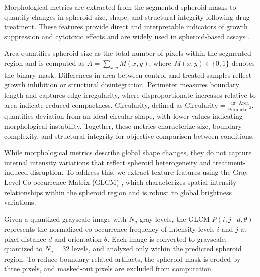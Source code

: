\documentclass[sigconf, nonacm]{acmart}
\begin{document}

Morphological metrics are extracted from the segmented spheroid masks to quantify changes in spheroid size, shape, and structural integrity following drug treatment. These features provide direct and interpretable indicators of growth suppression and cytotoxic effects and are widely used in spheroid-based assays \cite{ref10,ref11}.

Area quantifies spheroid size as the total number of pixels within the segmented region and is computed as $A = \sum_{x,y} M(x,y)$, where $M(x,y) \in \{0,1\}$ denotes the binary mask. Differences in area between control and treated samples reflect growth inhibition or structural disintegration. Perimeter measures boundary length and captures edge irregularity, where disproportionate increases relative to area indicate reduced compactness. Circularity, defined as $\text{Circularity} = \frac{4\pi \cdot \mathrm{Area}}{\mathrm{Perimeter}^2}$, quantifies deviation from an ideal circular shape, with lower values indicating morphological instability. Together, these metrics characterize size, boundary complexity, and structural integrity for objective comparison between conditions.



While morphological metrics describe global shape changes, they do not capture internal intensity variations that reflect spheroid heterogeneity and treatment-induced disruption. To address this, we extract texture features using the Gray-Level Co-occurrence Matrix (GLCM) \cite{ref6}, which characterizes spatial intensity relationships within the spheroid region and is robust to global brightness variations.

Given a quantized grayscale image with $N_g$ gray levels, the GLCM $P(i,j \mid d,\theta)$ represents the normalized co-occurrence frequency of intensity levels $i$ and $j$ at pixel distance $d$ and orientation $\theta$. Each image is converted to grayscale, quantized to $N_g = 32$ levels, and analyzed only within the predicted spheroid region. To reduce boundary-related artifacts, the spheroid mask is eroded by three pixels, and masked-out pixels are excluded from computation.
\end{document}
